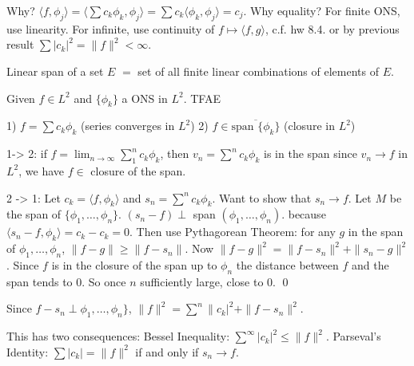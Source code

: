 Why? $\langle f, \phi_j \rangle = \langle \sum c_k \phi_k, \phi_j \rangle = \sum c_k \langle \phi_k, \phi_j \rangle= c_j$. Why equality? For finite ONS, use linearity. For infinite, use continuity of $f \mapsto \langle f,g \rangle$, c.f. hw 8.4. or by previous result $\sum |c_k|^2= \|f\|^2< \infty$. 


Linear span of a set $E$ $=$ set of all finite linear combinations of elements of $E$. 


\begin{thm}
Given $f \in L^2$ and $\{ \phi_k \}$ a ONS in $L^2$. TFAE

1) $f= \sum c_k \phi_k$ (series converges in $L^2$)
2) $f \in \overline{\text{span }\{\phi_k\}}$ (closure in $L^2$)
\end{thm}

1-> 2: if $f= \lim_{n \to \infty} \sum_1^n c_k \phi_k$, then $v_n = \sum^n c_k \phi_k$ is in the span since $v_n \to f$ in $L^2$, we have $f \in $ closure of the span. 

2 -> 1: Let $c_k= \langle f, \phi_k \rangle$ and $s_n= \sum^n c_k \phi_k$. Want to show that $s_n \to f$. Let $M$ be the span of $\{\phi_1,\ldots,\phi_n\}$. $(s_n-f) \perp $ span $(\phi_1,\ldots,\phi_n)$. because $\langle s_n -f, \phi_k \rangle= c_k-c_k=0$. Then use Pythagorean Theorem: for any $g$ in the span of $\phi_1,\ldots,\phi_n$, $\|f-g\| \geq \|f-s_n\|$. Now $\|f-g\|^2= \|f-s_n\|^2 + \|s_n-g\|^2$. Since $f$ is in the closure of the span up to $\phi_n$ the distance between $f$ and the span tends to 0. So once $n$ sufficiently large, close to 0. \qed \\


\begin{cor}
Since $f-s_n \perp \phi_1,\ldots,\phi_n\}$, $\|f\|^2= \sum^n \|c_k|^2 + \|f-s_n\|^2$.  
\end{cor}

This has two consequences: Bessel Inequality: $\sum^\infty |c_k|^2 \leq \|f\|^2$. Parseval's Identity: $\sum |c_k| = \|f\|^2$ if and only if $s_n \to f$. 


















